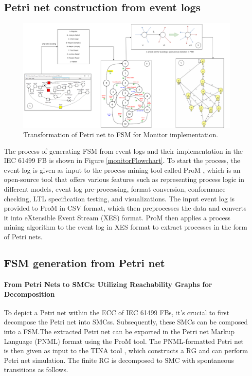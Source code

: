 \begin{bibunit}
\subsection{Petri net construction from event logs}



\begin{figure}[!t]
	\centering
	\includegraphics[width=1\textwidth]{MX_Papers/Paper7/images/PN2FSM.png}
	\caption{Transformation of Petri net to FSM for Monitor implementation.}
	\label{TR_PN2FSM}
\end{figure}


The process of generating FSM from event logs and their implementation in the IEC 61499 FB is shown in Figure \ref{monitorFlowchart}. To start the process, the event log is given as input to the process mining tool called ProM \cite{ProM}, which is an open-source tool that offers various features such as representing process logic in different models, event log pre-processing, format conversion, conformance checking, LTL specification testing, and visualizations. The input event log is provided to ProM in CSV format, which then preprocesses the data and converts it into eXtensible Event Stream (XES) format. ProM then applies a process mining algorithm to the event log in XES format to extract processes in the form of Petri nets.


\subsection{ FSM generation from Petri net
}

\paragraph{From Petri Nets to SMCs: Utilizing Reachability Graphs for Decomposition}


To depict a Petri net within the ECC of IEC 61499 FBs, it's crucial to first decompose the Petri net into SMCss. Subsequently, these SMCs can be composed into a FSM.The extracted Petri net can be exported in the Petri net Markup Language (PNML) format using the ProM tool. The PNML-formatted Petri net is then given as input to the TINA tool  \cite{berthomieu2004tool}, which constructs a RG and can perform Petri net simulation. The finite RG is decomposed to SMC with spontaneous transitions as follows. 



\end{bibunit}
